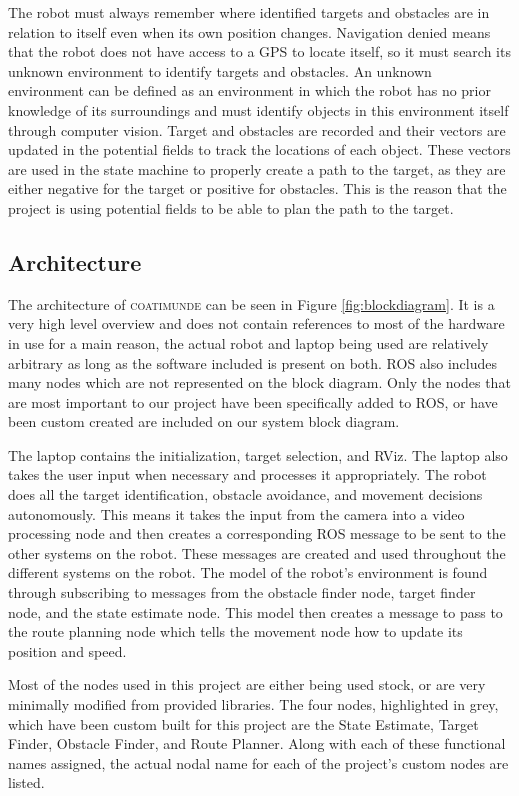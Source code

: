 \documentclass{article}[12]
\begin{document}
	The robot must always remember where identified targets and obstacles are in relation to itself even when its own position changes. Navigation denied means that the robot does not have access to a GPS to locate itself, so it must search its unknown environment to identify targets and obstacles. An unknown environment can be defined as an environment in which the robot has no prior knowledge of its surroundings and must identify objects in this environment itself through computer vision. 
Target and obstacles are recorded and their vectors are updated in the potential fields to track the locations of each object. These vectors are used in the state machine to properly create a path to the target, as they are either negative for the target or positive for obstacles. This is the reason that the project is using potential fields to be able to plan the path to the target. 


	\subsection{Architecture}
	
	The architecture of \textsc{coatimunde} can be seen in Figure \ref{fig:blockdiagram}. It is a very high level overview and does not contain references to most of the hardware in use for a main reason, the actual robot and laptop being used are relatively arbitrary as long as the software included is present on both. ROS also includes many nodes which are not represented on the block diagram. Only the nodes that are most important to our project have been specifically added to ROS, or have been custom created are included on our system block diagram.
	
	The laptop contains the initialization, target selection, and RViz. The laptop also takes the user input when necessary and processes it appropriately.  The robot does all the target identification, obstacle avoidance, and movement decisions autonomously. This means it takes the input from the camera into a video processing node and then creates a corresponding ROS message to be sent to the other systems on the robot. These messages are created and used throughout the different systems on the robot. The model of the robot's environment is found through subscribing to messages from the obstacle finder node, target finder node, and the state estimate node. This model then creates a message to pass to the route planning node which tells the movement node how to update its position and speed. 
	
	Most of the nodes used in this project are either being used stock, or are very minimally modified from provided libraries. The four nodes, highlighted in grey, which have been custom built for this project are the State Estimate, Target Finder, Obstacle Finder, and Route Planner. Along with each of these functional names assigned, the actual nodal name for each of the project's custom nodes are listed.
\end{document}

